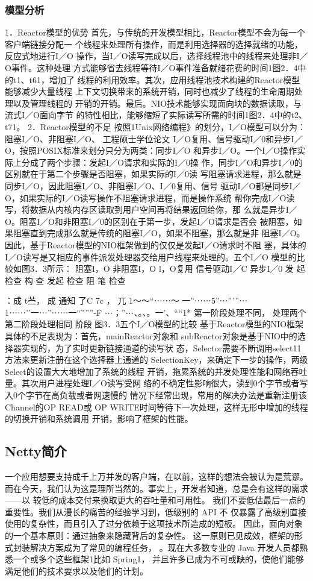 \subsubsection*{模型分析}
1．Reactor模型的优势
首先，与传统的开发模型相比，Reactor模型不会为每一个客户端链接分配一
个线程来处理所有操作，而是利用选择器的选择就绪的功能，反应式地进行I／O
操作，当I／O读写完成以后，选择线程池中的线程来处理非I／O事件。这种处理
方式能够省去线程等待I／O事件准备就绪花费的时间1图2．4中的t1、t61，增加了
线程的利用效率。其次，应用线程池技术构建的Reactor模型能够减少大量线程
上下文切换带来的系统开销，同时也减少了线程的生命周期处理以及管理线程的
开销的开销。最后。NIO技术能够实现面向块的数据读取，与流式I／O面向字节
的特性相比，能够缩短了实际读写所需的时间1图2．4中的t2、t71。
2．Reactor模型的不足
按照1Unix网络编程》的划分，I／O模型可以分为：阻塞I／O、非阻塞I／O、
工程硕士学位论文
I／O复用、信号驱动I／0和异步I／O，按照POSIX标准来划分只分为两类：同步I／O
和异步I／O。一个I／O操作实际上分成了两个步骤：发起I／O请求和实际的I／0操
作，同步I／O和异步I／0的区别就在于第二个步骤是否阻塞，如果实际的I／0读
写阻塞请求进程，那么就是同步I／O，因此阻塞I／O、非阻塞I／O、I／0复用、信号
驱动I／O都是同步I／O，如果实际的I／O读写操作不阻塞请求进程，而是操作系统
帮你完成I／O读写，将数据从内核内存区读取到用户空间再将结果返回给你，那
么就是异步I／O。阻塞I／O和非阻塞I／0的区别在于第一步，发起I／O请求是否会
被阻塞，如果阻塞直到完成那么就是传统的阻塞I／O，如果不阻塞，那么就是非
阻塞I／O。因此，基于Reactor模型的NIO框架做到的仅仅是发起I／O请求时不阻
塞，具体的I／O读写是又相应的事件派发处理器交给用户线程来处理的。五个I／O
模型的比较如图3．3所示：
阻塞I，O 非阻塞I，O
l，O复用
信号驱动I／C 异步I／0
发 起
检查 构 查 发起
检查
阻
笔
检查

：成
t苎，
成 通知 了C 7c ， 兀
1～～“⋯⋯～ 一”⋯⋯5”⋯”’”⋯1⋯⋯’’一⋯”⋯⋯一“”””-F ⋯；”⋯、。、。一’、““1*
第一阶段处理不同，
处理两个
第二阶段处理相同
阶段
图3．3五个I／O模型的比较
基于Reactor模型的NIO框架具体的不足表现为：首先，mainReactor对象和
subReactor对象是基于NIO中的选择器实现的，为了实时更新链接通道的读写状
态，Selector需要不断调用select11方法来更新注册在这个选择器上通道的
SelectionKey，来确定下一步的操作，两级Select的设置大大地增加了系统的线程
开销，拖累系统的并发处理性能和网络吞吐量。其次用户进程处理I／O读写受网
络的不确定性影响很大，读到0个字节或者写入0个字节在高负载或者网速慢的
情况下经常出现，常用的解决办法是重新注册该Channel的OP READ或
OP WRITE时间等待下一次处理，这样无形中增加的线程的切换开销和系统调用
开销，影响了框架的性能。
\subsection*{Netty简介}
一个应用想要支持成千上万并发的客户端，在以前，这样的想法会被认为是荒谬。
而在今天，我们认为这是理所当然的。事实上，开发者知道，总是会有这样的需求——以
较低的成本交付来换取更大的吞吐量和可用性。
我们不要低估最后一点的重要性。我们从漫长的痛苦的经验学习到，低级别的 API 不
仅暴露了高级别直接使用的复杂性，而且引入了过分依赖于这项技术所造成的短板。
因此，面向对象的一个基本原则：通过抽象来隐藏背后的复杂性。
这一原则已见成效，框架的形式封装解决方案成为了常见的编程任务，
。现在大多数专业的 Java 开发人员都熟悉一个或多个这些框架1比如 Spring1，
并且许多已成为不可或缺的，使他们能够满足他们的技术要求以及他们的计划。

